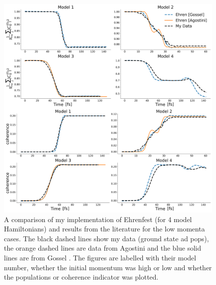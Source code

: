 \begin{figure}[ht]
	\includegraphics[width=\textwidth]{../img/CTMQC/TullyModels/Ehren_lowMom.png}
	\caption{\label{fig:LitCompEhrenTullyLow}A comparison of my implementation of Ehrenfest (for 4 model Hamiltonians) and results from the literature for the low momenta cases. The black dashed lines show my data (ground state ad pops), the orange dashed lines are data from Agostini \cite{agostini_quantum-classical_2016} and the blue solid lines are from Gossel \cite{gossel_coupled-trajectory_2018}. The figures are labelled with their model number, whether the initial momentum was high or low and whether the populations or coherence indicator was plotted.}
\end{figure}
